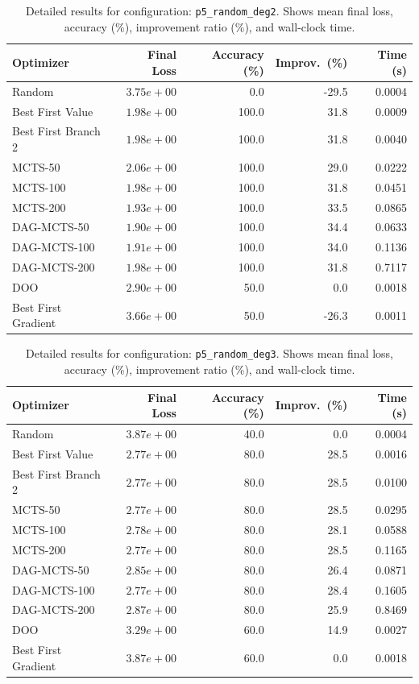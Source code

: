 \begin{table}[H]
\centering
\caption{Detailed results for configuration: \texttt{p5\_random\_deg2}. Shows mean final loss, accuracy (\%), improvement ratio (\%), and wall-clock time.}
\label{tab:funclearn-detail-25}
\begin{tabular}{lrrrr}
\toprule
Optimizer & Final Loss & Accuracy (\%) & Improv.~(\%) & Time (s) \\
\midrule
Random & $3.75e+00$ & 0.0 & -29.5 & 0.0004 \\
\hline
Best First Value & $1.98e+00$ & 100.0 & 31.8 & 0.0009 \\
\hline
Best First Branch 2 & $1.98e+00$ & 100.0 & 31.8 & 0.0040 \\
\hline
MCTS-50 & $2.06e+00$ & 100.0 & 29.0 & 0.0222 \\
\hline
MCTS-100 & $1.98e+00$ & 100.0 & 31.8 & 0.0451 \\
\hline
MCTS-200 & $1.93e+00$ & 100.0 & 33.5 & 0.0865 \\
\hline
DAG-MCTS-50 & \textbf{$1.90e+00$} & 100.0 & 34.4 & 0.0633 \\
\hline
DAG-MCTS-100 & $1.91e+00$ & 100.0 & 34.0 & 0.1136 \\
\hline
DAG-MCTS-200 & $1.98e+00$ & 100.0 & 31.8 & 0.7117 \\
\hline
DOO & $2.90e+00$ & 50.0 & 0.0 & 0.0018 \\
\hline
Best First Gradient & $3.66e+00$ & 50.0 & -26.3 & 0.0011 \\
\bottomrule
\end{tabular}
\end{table}

\begin{table}[H]
\centering
\caption{Detailed results for configuration: \texttt{p5\_random\_deg3}. Shows mean final loss, accuracy (\%), improvement ratio (\%), and wall-clock time.}
\label{tab:funclearn-detail-26}
\begin{tabular}{lrrrr}
\toprule
Optimizer & Final Loss & Accuracy (\%) & Improv.~(\%) & Time (s) \\
\midrule
Random & $3.87e+00$ & 40.0 & 0.0 & 0.0004 \\
\hline
Best First Value & $2.77e+00$ & 80.0 & 28.5 & 0.0016 \\
\hline
Best First Branch 2 & \textbf{$2.77e+00$} & 80.0 & 28.5 & 0.0100 \\
\hline
MCTS-50 & $2.77e+00$ & 80.0 & 28.5 & 0.0295 \\
\hline
MCTS-100 & $2.78e+00$ & 80.0 & 28.1 & 0.0588 \\
\hline
MCTS-200 & $2.77e+00$ & 80.0 & 28.5 & 0.1165 \\
\hline
DAG-MCTS-50 & $2.85e+00$ & 80.0 & 26.4 & 0.0871 \\
\hline
DAG-MCTS-100 & $2.77e+00$ & 80.0 & 28.4 & 0.1605 \\
\hline
DAG-MCTS-200 & $2.87e+00$ & 80.0 & 25.9 & 0.8469 \\
\hline
DOO & $3.29e+00$ & 60.0 & 14.9 & 0.0027 \\
\hline
Best First Gradient & $3.87e+00$ & 60.0 & 0.0 & 0.0018 \\
\bottomrule
\end{tabular}
\end{table}

